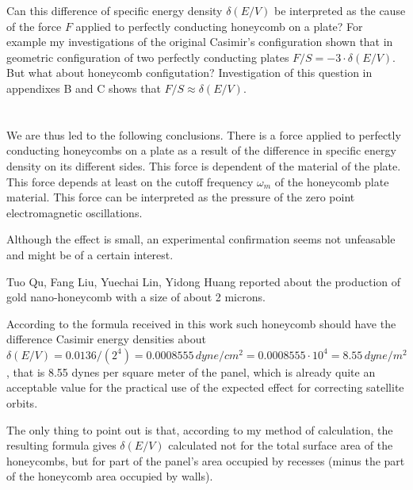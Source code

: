 \documentclass[twoside, 10pt]{article}
\begin{document}
\begin{multicols}{2}
    Can this difference of specific energy density
\(\delta\left(E/V\right)\) be interpreted as the cause of the force
\(F\) applied to perfectly conducting honeycomb on a plate? For example
my investigations of the original Casimir's configuration shown that in
geometric configuration of two perfectly conducting plates
\(F/S = -3 \cdot \delta\left(E/V\right)\). But what about honeycomb
configutation? Investigation of this question in appendixes B and C
shows that \(F/S \approx \delta\left(E/V\right)\).


    \section*{}\label{conclusions}
\vspace{-3.5mm}


    We are thus led to the following conclusions. There is a force applied
to perfectly conducting honeycombs on a plate as a result of the
difference in specific energy density on its different sides. This force
is dependent of the material of the plate. This force depends at least
on the cutoff frequency \(\omega_m\) of the honeycomb plate material.
This force can be interpreted as the pressure of the zero point
electromagnetic oscillations.

    Although the effect is small, an experimental confirmation seems not
unfeasable and might be of a certain interest.

    Tuo Qu, Fang Liu, Yuechai Lin, Yidong Huang \cite{Tuo2019} reported
about the production of gold nano-honeycomb with a size of about 2
microns.

    According to the formula received in this work such honeycomb should
have the difference Casimir energy densities about
\(\delta\left(E/V\right) = 0.0136/({2^4}) = 0.0008555\,dyne/cm^2 = 0.0008555 \cdot 10^4 = 8.55\,dyne/m^2\),
that is 8.55 dynes per square meter of the panel, which is already quite
an acceptable value for the practical use of the expected effect for
correcting satellite orbits.

    The only thing to point out is that, according to my method of
calculation, the resulting formula gives \(\delta\left(E/V\right)\)
calculated not for the total surface area of the honeycombs, but for
part of the panel's area occupied by recesses (minus the part of the
honeycomb area occupied by walls).


\end{multicols}
\end{document}
